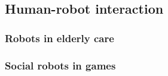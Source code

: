 \subsection{Human-robot interaction}


\subsubsection{Robots in elderly care}


\subsubsection{Social robots in games}